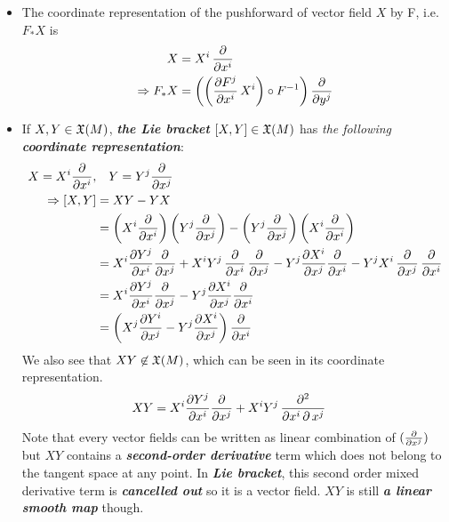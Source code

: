 \documentclass[11pt]{article}
\begin{document}
\begin{itemize}
\item The coordinate representation of the pushforward of vector field $X$ by F, i.e. $F_{*}X$ is
\begin{align}
X &= X^i\, \frac{\partial }{ \partial x^i} \nonumber\\
\Rightarrow F_{*}X &= \left(\left(\frac{\partial F^{j}}{ \partial x^i}\,X^i\right) \circ F^{-1}\right)\frac{\partial }{ \partial y^j}
\end{align}

\item If $X, Y \in {\mathfrak X}(M)$, \emph{\textbf{the Lie bracket}} $[X, Y] \in {\mathfrak X}(M)$ has \emph{the following \textbf{coordinate representation}}:
\begin{align}
X = X^i\frac{\partial }{ \partial x^i}, &\quad Y = Y^j\frac{\partial }{ \partial x^j} \nonumber\\
\Rightarrow \left[X , Y\right] &= XY - YX \nonumber\\
&=  \left(X^i\frac{\partial }{ \partial x^i}\right)\left(Y^j\frac{\partial }{ \partial x^j}\right) - \left(Y^j\frac{\partial }{ \partial x^j}\right)\left(X^i\frac{\partial }{ \partial x^i}\right) \nonumber\\
&=  X^i\frac{\partial Y^j}{ \partial x^i}\frac{\partial }{ \partial x^j} + X^iY^j\,\frac{\partial }{ \partial x^i}\,\frac{\partial }{ \partial x^j}  - Y^j\frac{\partial X^i}{ \partial x^j}\frac{\partial }{ \partial x^i}   - Y^jX^i\,\frac{\partial }{ \partial x^j}\,\frac{\partial }{ \partial x^i}  \nonumber\\
&= X^i\frac{\partial Y^j}{ \partial x^i}\frac{\partial }{ \partial x^j} - Y^j\frac{\partial X^i}{ \partial x^j}\frac{\partial }{ \partial x^i} \nonumber\\
&=\left(X^j\frac{\partial Y^i}{ \partial x^j} - Y^j\frac{\partial X^i}{ \partial x^j}\right)\frac{\partial }{ \partial x^i}  \label{eqn: lie_bracket_coordinate}
\end{align}
We also see that $XY  \not\in {\mathfrak X}(M)$, which can be seen in its coordinate representation.
\begin{align*}
XY &= X^i\frac{\partial Y^j}{ \partial x^i}\frac{\partial }{ \partial x^j} + X^iY^j\,\frac{\partial ^2}{ \partial x^i\,\partial\,x^j}
\end{align*} Note that every vector fields can be written as linear combination of $(\frac{\partial }{ \partial x^j} )$ but $XY$ contains a \emph{\textbf{second-order derivative}} term which does not belong to the tangent space at any point. In \emph{\textbf{Lie bracket}}, this second order mixed derivative term is \emph{\textbf{cancelled out}} so it is a vector field. $XY$ is still \emph{\textbf{a linear smooth map}} though.
\end{itemize}
\end{document}
